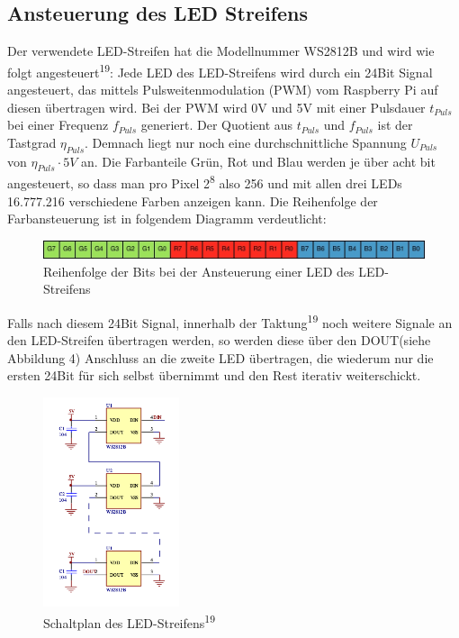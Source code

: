 \documentclass [a4paper, 11pt] {article}
\begin{document}
\subsection{Ansteuerung des LED Streifens}
Der verwendete LED-Streifen hat die Modellnummer WS2812B und wird wie folgt angesteuert\textsuperscript{19}:
Jede LED des LED-Streifens wird durch ein 24Bit Signal angesteuert, das mittels Pulsweitenmodulation (PWM) vom Raspberry Pi auf diesen übertragen wird. Bei der PWM wird 0V und 5V mit einer Pulsdauer $t_{Puls}$ bei einer Frequenz $f_{Puls}$ generiert. Der Quotient aus $t_{Puls}$ und $f_{Puls}$ ist der Tastgrad $\eta_{Puls}$. Demnach liegt nur noch eine durchschnittliche Spannung $U_{Puls}$ von $\eta_{Puls} \cdot 5V$ an. Die Farbanteile Grün, Rot und Blau werden je über acht bit angesteuert, so dass man pro Pixel 2\textsuperscript 8 also 256 und mit allen drei LEDs 16.777.216 verschiedene Farben anzeigen kann. Die Reihenfolge der Farbansteuerung ist in folgendem Diagramm verdeutlicht:
\begin{figure}[H]
	\centering
	\includegraphics[width=16cm]{rgbtabelle.png}
	\caption{Reihenfolge der Bits bei der Ansteuerung einer LED des LED-Streifens}
	\label{bits}
\end{figure}
Falls nach diesem 24Bit Signal, innerhalb der Taktung\textsuperscript{19} noch weitere Signale an den LED-Streifen übertragen werden, so werden diese über den DOUT(siehe Abbildung 4) Anschluss an die zweite LED übertragen, die wiederum nur die ersten 24Bit für sich selbst übernimmt und den Rest iterativ weiterschickt.
\begin{figure}[H]
	\centering
	\includegraphics[width=4cm]{Schaltplan_des_LED-Streifens.png}
	\caption{Schaltplan des LED-Streifens\textsuperscript{19}}
	\label{Schaltplan}
\end{figure}
\end{document}
